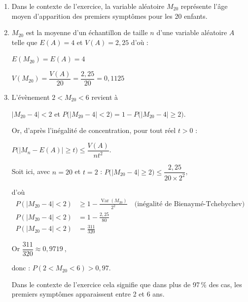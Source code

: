 \documentclass[10pt]{article}
\providecommand{\np}[2][]{{#2~#1}}
\begin{document}
\begin{enumerate}
	\item Dans le contexte de l'exercice, la variable aléatoire $M_{20}$ représente l'âge moyen d'apparition des premiers symptômes pour les 20 enfants.
	\item  $M_{20}$ est la moyenne d'un échantillon de taille $n$ d'une variable aléatoire $A$ telle que $E(A)=4$ et $V(A)=2,25$ d'où :

$E\left(M_{20}\right) = E(A)= 4$


$V\left(M_{20}\right) = \dfrac{V(A)}{20}=\dfrac{2,25}{20} = \np{0,1125}$

	\item L'évènement \og $2<M_{20}< 6$ \fg{} revient à 
	
$\big|M_{20} - 4 \big| < 2$ et $P\Big(\big|M_{20} - 4 \big| < 2\Big) = 1 - P\Big(\big|M_{20} - 4 \big| \geqslant 2\Big)$.

Or, d'après l'inégalité de concentration, pour tout réel $t > 0$ : 

$P\Big(\big|M_n - E(A)\big| \geqslant t \Big) \leqslant \dfrac{V(A)}{nt^2}$.

Soit ici, avec $n=20$ et $t =2$ : $P\Big(\big|M_{20} - 4 \big| \geqslant 2\Big) \leqslant \dfrac{2,25}{20 \times 2^2}$,

d'où \[
\begin{aligned}
P\left( \left| M_{20} - 4 \right| < 2 \right)
&\geqslant 1 - \frac{\operatorname{Var}(M_{20})}{2^2} \quad \text{(inégalité de Bienaymé-Tchebychev)} \\
P\left( \left| M_{20} - 4 \right| < 2 \right)&= 1 - \frac{2,25}{80} \\
P\left( \left| M_{20} - 4 \right| < 2 \right)&= \frac{311}{320}
\end{aligned}
\]

Or $\dfrac{311}{320}\approx \np{0,9719}$,

donc : $ P(2 < M_{20} < 6) > 0,97.$

Dans le contexte de l'exercice cela signifie que dans plus de 97\,\% des cas, les premiers symptômes apparaissent entre 2 et 6 ans.
\end{enumerate}

\medskip
\end{document}
